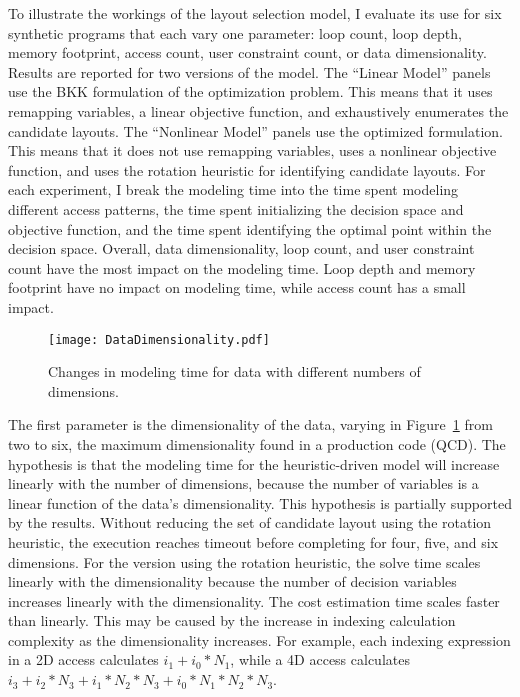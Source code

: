 To illustrate the workings of the layout selection model, I evaluate its use for six synthetic programs that each vary one parameter: loop count, loop depth, memory footprint, access count, user constraint count, or data dimensionality.
Results are reported for two versions of the model.
The ``Linear Model'' panels use the BKK formulation of the optimization problem.
This means that it uses remapping variables, a linear objective function, and exhaustively enumerates the candidate layouts.
The ``Nonlinear Model'' panels use the optimized \FormatDecisions{} formulation.
This means that it does not use remapping variables, uses a nonlinear objective function, and uses the rotation heuristic for identifying candidate layouts.
For each experiment, I break the modeling time into the time spent modeling different access patterns, the time spent initializing the decision space and objective function, and the time spent identifying the optimal point within the decision space. 
Overall, data dimensionality, loop count, and user constraint count have the most impact on the modeling time.
Loop depth and memory footprint have no impact on modeling time, while access count has a small impact.

\begin{figure}
	\centering
	\texttt{[image: DataDimensionality.pdf]}
	\caption{Changes in modeling time for data with different numbers of dimensions.}\label{DataDimensionality}
\end{figure}
The first parameter is the dimensionality of the data, varying in Figure~\ref{DataDimensionality} from two to six, the maximum dimensionality found in a production code (QCD).
The hypothesis is that the modeling time for the heuristic-driven model will increase linearly with the number of dimensions, because the number of variables is a linear function of the data's dimensionality.
This hypothesis is partially supported by the results.
Without reducing the set of candidate layout using the rotation heuristic, the execution reaches timeout before completing for four, five, and six dimensions.
For the version using the rotation heuristic, the solve time scales linearly with the dimensionality because the number of decision variables increases linearly with the dimensionality.
The cost estimation time scales faster than linearly. 
This may be caused by the increase in indexing calculation complexity as the dimensionality increases.
For example, each indexing expression in a 2D access calculates $i_1 + i_0 * N_1$, while a 4D access calculates $i_3 + i_2 * N_3 + i_1 * N_2 * N_3 + i_0 * N_1 * N_2 * N_3$.

